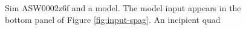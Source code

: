 \documentclass[12pt,preprint]{aastex}
\begin{document}
\begin{figure}
{  }
  \caption[result 6919 (ASW0002z6f)]{Sim ASW0002z6f and a model.  The
    model input appears in the bottom panel of Figure
    \ref{fig:input-spag}. An incipient quad}
  \label{fig:6919}
\end{figure}
\end{document}

